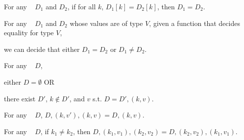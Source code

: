 \begin{proposition}[\SemTot]

\breakAndIndent
%

\end{proposition}

\begin{theorem}[\SemInj]
\label{thm:SemInj}

\breakAndIndent
%
For any \dds~ $D_1$ and $D_2$,
%
if for all $k$, $D_1[k] = D_2[k]$,
%
then $D_1 = D_2$.

\end{theorem}

\begin{theorem}[\EqDec]
\label{thm:EqDec}

\breakAndIndent
%
For any \dds~ $D_1$ and $D_2$ whose values are of type $V$,
%
given a function that decides equality for type $V$,
%

\justIndent
%
we can decide that either $D_1 = D_2$ or $D_1 \ne D_2$.

\end{theorem}

\begin{theorem}
\label{thm:EzDstr}

\breakAndIndent
%
For any \dd~ $D$,

\justIndent \quad
%
either $D = \emptyset$ OR

\justIndent \quad
%
there exist $D'$, $k \notin D'$, and $v$
%
s.t. $D = D' , (k, v)$.

\end{theorem}



\begin{theorem}
\label{thm:cont-dicts}

\breakAndIndent
%
For any {\dd}~ $D$,
%
$D, (k, v'), (k, v) = D, (k, v)$.

\end{theorem}

\begin{theorem}
\label{thm:exch-dicts}

\breakAndIndent
%
For any {\dd}~ $D$,
%
if $k_1 \ne k_2$, then
%
$D, (k_1, v_1), (k_2, v_2) = D, (k_2, v_2), (k_1, v_1)$.

\end{theorem}
